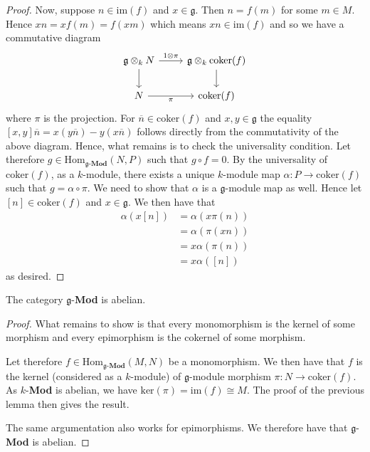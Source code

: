 \begin{proof}
  Now, suppose $ n \in \text{im}(f) $ and $ x \in \mathfrak{g} $. Then $ n = f(m) $ for some $ m \in M $. Hence $ xn = xf(m) = f(xm) $ which means $ xn \in \text{im}(f) $ and so we have a commutative diagram
  \[\begin{tikzcd}
	  {\mathfrak{g} \otimes_k N} & {\mathfrak{g} \otimes_k \text{coker}(f)} \\
	  N & {\text{coker}(f)}
	  \arrow[from=1-1, to=2-1]
	  \arrow["\pi"', from=2-1, to=2-2]
	  \arrow["{1 \otimes \pi}", from=1-1, to=1-2]
	  \arrow[from=1-2, to=2-2]
  \end{tikzcd}\]
  where $ \pi $ is the projection. For $ \overline{n} \in \text{coker}(f) $ and $ x,y \in \mathfrak{g} $ the equality $ [x,y]\overline{n} = x(y\overline{n}) - y(x\overline{n}) $ follows directly from the commutativity of the above diagram. Hence, what remains is to check the universality condition. Let therefore $ g \in \text{Hom}_{\mathfrak{g}\text{-}\mathbf{Mod}}(N, P) $ such that $ g\circ f = 0 $. By the universality of $ \text{coker}(f) $, as a $ k $-module, there exists a unique $ k $-module map $ \alpha: P \to \text{coker}(f) $ such that $ g = \alpha \circ \pi $. We need to show that $ \alpha $ is a $ \mathfrak{g} $-module map as well. Hence let $ [n] \in \text{coker}(f) $ and $ x \in \mathfrak{g} $. We then have that
  \begin{align*}
    \alpha(x[n]) &= \alpha(x\pi(n)) \\
                 &= \alpha(\pi(xn)) \\
                 &= x\alpha(\pi(n)) \\
                 &= x\alpha([n])
  \end{align*}
  as desired.
\end{proof}

\begin{proposition}
  \label{prop:abelian}
  The category $ \mathfrak{g} $-\textbf{Mod} is abelian.
\end{proposition}
\begin{proof}
  What remains to show is that every monomorphism is the kernel of some morphism and every epimorphism is the cokernel of some morphism.

  Let therefore $ f \in \text{Hom}_{\mathfrak{g}\text{-}\mathbf{Mod}}(M, N) $ be a monomorphism. We then have that $ f $ is the kernel (considered as a $ k $-module) of $ \mathfrak{g} $-module morphism $ \pi: N \to \text{coker}(f) $. As $ k $-\textbf{Mod} is abelian, we have $ \text{ker}(\pi) = \text{im}(f) \cong M $. The proof of the previous lemma then gives the result.

  The same argumentation also works for epimorphisms. We therefore have that $ \mathfrak{g} $-\textbf{Mod} is abelian.
\end{proof}

